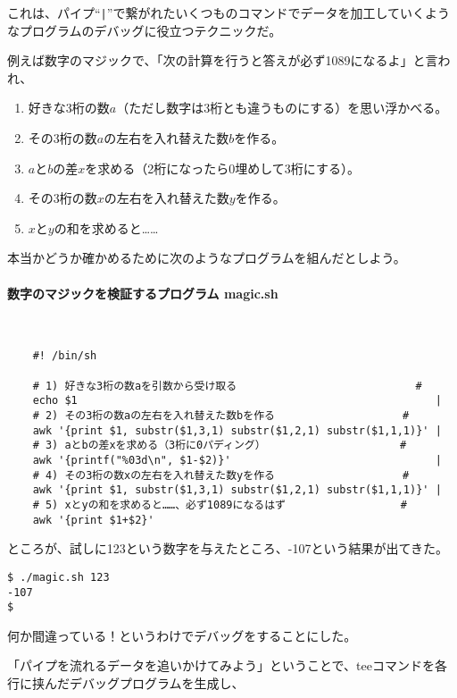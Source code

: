 これは、パイプ``\verb!|!''で繋がれたいくつものコマンドでデータを加工していくようなプログラムのデバッグに役立つテクニックだ。

例えば数字のマジックで、「次の計算を行うと答えが必ず1089になるよ」と言われ、
\begin{enumerate}
  \item 好きな3桁の数$a$（ただし数字は3桁とも違うものにする）を思い浮かべる。
  \item その3桁の数$a$の左右を入れ替えた数$b$を作る。
  \item $a$と$b$の差$x$を求める（2桁になったら0埋めして3桁にする）。
  \item その3桁の数$x$の左右を入れ替えた数$y$を作る。
  \item $x$と$y$の和を求めると……
\end{enumerate}
本当かどうか確かめるために次のようなプログラムを組んだとしよう。
\paragraph{数字のマジックを検証するプログラム magic.sh} 　\\
\begin{frameboxit}{160.0mm}
\begin{verbatim}
	#! /bin/sh
	
	# 1) 好きな3桁の数aを引数から受け取る                            #
	echo $1                                                        |
	# 2) その3桁の数aの左右を入れ替えた数bを作る                    #
	awk '{print $1, substr($1,3,1) substr($1,2,1) substr($1,1,1)}' |
	# 3) aとbの差xを求める（3桁に0パディング）                     #
	awk '{printf("%03d\n", $1-$2)}'                                |
	# 4) その3桁の数xの左右を入れ替えた数yを作る                    #
	awk '{print $1, substr($1,3,1) substr($1,2,1) substr($1,1,1)}' |
	# 5) xとyの和を求めると……、必ず1089になるはず                  #
	awk '{print $1+$2}'
\end{verbatim}
\end{frameboxit}
ところが、試しに123という数字を与えたところ、-107という結果が出てきた。
\begin{screen}
	\verb!$ ./magic.sh 123! \return \\
	\verb|-107| \\
	\verb|$ |
\end{screen}
何か間違っている！というわけでデバッグをすることにした。

「パイプを流れるデータを追いかけてみよう」ということで、teeコマンドを各行に挟んだデバッグプログラムを生成し、
